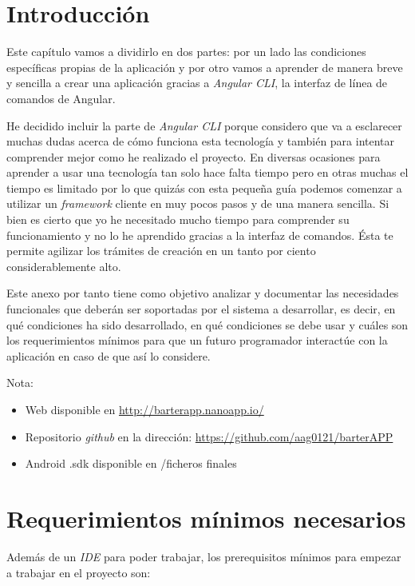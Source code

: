 
\section{Introducción}\label{introduccion-programador}
Este capítulo vamos a dividirlo en dos partes: por un lado las condiciones específicas propias de la aplicación y por otro vamos a aprender de manera breve y sencilla a crear una aplicación gracias a \emph{Angular CLI}, la interfaz de línea de comandos de Angular.

He decidido incluir la parte de \emph{Angular CLI}  porque considero que va a esclarecer muchas dudas acerca de cómo funciona esta tecnología y también para intentar comprender mejor como he realizado el proyecto. En diversas ocasiones para aprender a usar una tecnología tan solo hace falta tiempo pero en otras muchas el tiempo es limitado por lo que quizás con esta pequeña guía podemos comenzar a utilizar un \emph{framework} cliente en muy pocos pasos y de una manera sencilla. Si bien es cierto que yo he necesitado mucho tiempo para comprender su funcionamiento y no lo he aprendido gracias a la interfaz de comandos. Ésta te permite agilizar los trámites de creación en un tanto por ciento considerablemente alto.

Este anexo por tanto tiene como objetivo analizar y documentar las necesidades funcionales que deberán ser soportadas por el sistema a desarrollar, es decir, en qué condiciones ha sido desarrollado, en qué condiciones se debe usar y cuáles son los requerimientos mínimos para que un futuro programador interactúe con la aplicación en caso de que así lo considere.


Nota: 

\begin{itemize}
\item Web disponible en \url{ http://barterapp.nanoapp.io/}
\item Repositorio \emph{github}  en la dirección: \url{https://github.com/aag0121/barterAPP}
\item Android .sdk disponible en /ficheros finales
\end{itemize}

\section{Requerimientos mínimos necesarios}
Además de un \emph{IDE} \cite{ides} para poder trabajar, los prerequisitos mínimos para empezar a trabajar en el proyecto son:


